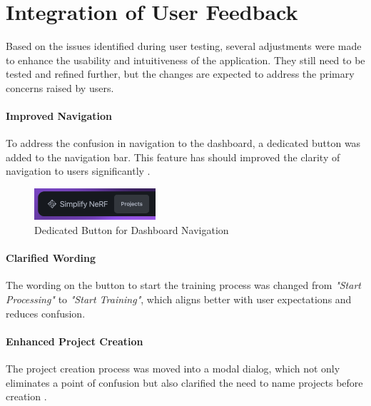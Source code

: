 \section{Integration of User Feedback}
\label{sec:discussion:user-feedback}

Based on the issues identified during user testing, several adjustments were made to enhance the usability and intuitiveness of the application.
They still need to be tested and refined further, but the changes are expected to address the primary concerns raised by users.

\paragraph{Improved Navigation}
To address the confusion in navigation to the dashboard, a dedicated button was added to the navigation bar.
This feature has should improved the clarity of  navigation to users significantly .

\begin{figure}[htb]
  \centering
	\includegraphics[width=0.4\textwidth]{figures/fix-1.png}
	\caption{Dedicated Button for Dashboard Navigation}
  \label{fig:fix-1}
\end{figure}

\paragraph{Clarified Wording}
The wording on the button to start the training process was changed from \emph{"Start Processing"} to \emph{"Start Training"}, which aligns better with user expectations and reduces confusion.


\paragraph{Enhanced Project Creation}
The project creation process was moved into a modal dialog, which not only eliminates a point of confusion but also clarified the need to name projects before creation .

